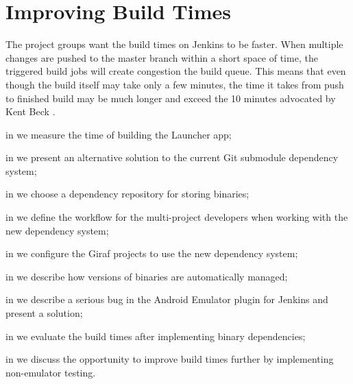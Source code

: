 \chapter{Improving Build Times}
The project groups want the build times on Jenkins to be faster. When multiple changes are pushed to the master branch within a short space of time, the triggered build jobs will create congestion the build queue. This means that even though the build itself may take only a few minutes, the time it takes from push to finished build may be much longer and exceed the 10 minutes advocated by Kent Beck \parencite{beck2004}.

\begin{chapterorganization}
  \item in  we measure the time of building the Launcher app;
  \item in  we present an alternative solution to the current Git submodule dependency system;
  \item in  we choose a dependency repository for storing binaries;
  \item in  we define the workflow for the multi-project developers when working with the new dependency system;
  \item in  we configure the Giraf projects to use the new dependency system;
  \item in  we describe how versions of binaries are automatically managed;
  \item in  we describe a serious bug in the Android Emulator plugin for Jenkins and present a solution;
  \item in  we evaluate the build times after implementing binary dependencies;
  \item in  we discuss the opportunity to improve build times further by implementing non-emulator testing.
\end{chapterorganization}

